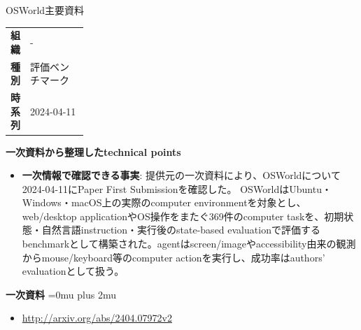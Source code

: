 \begin{technicalnote}{OSWorld}{主要資料}
\begingroup
\begin{tabularx}{\linewidth}{@{}>{\bfseries}p{0.22\linewidth}X@{}}
組織 & - \\
種別 & 評価ベンチマーク \\
時系列 & 2024-04-11 \\
\end{tabularx}
\smallskip
\begin{minipage}{\linewidth}
{\bfseries 一次資料から整理したtechnical points}
\begin{itemize}[leftmargin=1.5em,itemsep=0.35em]
\item \textbf{一次情報で確認できる事実}: 提供元の一次資料により、OSWorldについて2024-04-11にPaper First Submissionを確認した。 OSWorldはUbuntu・Windows・macOS上の実際のcomputer environmentを対象とし、web/desktop applicationやOS操作をまたぐ369件のcomputer taskを、初期状態・自然言語instruction・実行後のstate-based evaluationで評価するbenchmarkとして構築された。agentはscreen/imageやaccessibility由来の観測からmouse/keyboard等のcomputer actionを実行し、成功率はauthors' evaluationとして扱う。
\end{itemize}
\begin{minipage}{\linewidth}
\begin{samepage}
{\bfseries 一次資料}
\begingroup\sloppy
\Urlmuskip=0mu plus 2mu\relax
\begin{itemize}[leftmargin=1.5em,itemsep=0.25em]
\item {\scriptsize\url{http://arxiv.org/abs/2404.07972v2}}
\end{itemize}
\endgroup
\end{samepage}
\end{minipage}
\end{minipage}
\endgroup
\end{technicalnote}
\medskip

